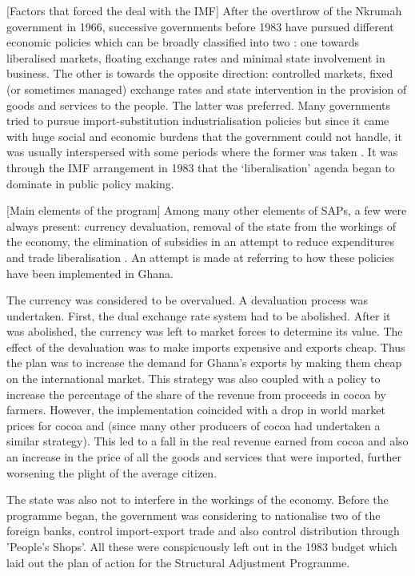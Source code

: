 \documentclass[a4paper, 12pt]{article}
\begin{document}
	[Factors that forced the deal with the IMF]
	After the overthrow of the Nkrumah government in 1966, successive governments before 1983 have pursued different economic policies which can be broadly classified into two : one towards liberalised markets, floating exchange rates and minimal state involvement in business. The other is towards the opposite direction: controlled markets, fixed (or sometimes managed) exchange rates and state intervention in the provision of goods and services to the people. The latter was preferred. Many governments tried to pursue import-substitution industrialisation policies but since it came with huge social and economic burdens that the government could not handle, it was usually interspersed with some periods where the former was taken \cite{hutchful1989revolution}. It was through the IMF arrangement in 1983 that the `liberalisation' agenda began to dominate in public policy making.
	
	
	[Main elements of the program]
	Among many other elements of SAPs, a few were always present: currency devaluation, removal of the state from the workings of the economy, the elimination of subsidies in an attempt to reduce expenditures and trade liberalisation \cite{ThingsFallAp}. An attempt is made at referring to how these policies have been implemented in Ghana.
	
	The currency was considered to be overvalued. A devaluation process was undertaken. First, the dual exchange rate system had to be abolished. After it was abolished, the currency was left to market forces to determine its value. The effect of the devaluation was to make imports expensive and exports cheap. Thus the plan was to increase the demand for Ghana's exports by making them cheap on the international market. This strategy was also coupled with a policy to increase the percentage of the share of the revenue from proceeds in cocoa by farmers. However, the implementation coincided with a drop in world market prices for cocoa and (since many other producers of cocoa had undertaken a similar strategy). This led to a fall in the real revenue earned from cocoa and also an increase in the price of all the goods and services that were imported, further worsening the plight of the average citizen. 
	
	The state was also not to interfere in the workings of the economy. Before the programme began, the government was considering to nationalise two of the foreign banks, control import-export trade and also control distribution through 'People's Shops'. All these were conspicuously left out in the 1983 budget which laid out the plan of action for the Structural Adjustment Programme.
	
\end{document}
